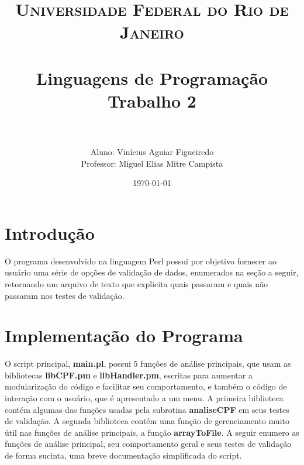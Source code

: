 \documentclass[paper=a4, fontsize=12pt]{scrartcl} %
\title{	
\normalfont \normalsize 
\textsc{Universidade Federal do Rio de Janeiro} \\ [25pt] %
\horrule{0.5pt} \\[0.4cm] %
\huge Linguagens de Programação \\
\huge Trabalho 2 \\ %
\horrule{2pt} \\[0.5cm] %
}
\author{Aluno: Vinícius Aguiar Figueiredo \\
		Professor: Miguel Elias Mitre Campista} %
\date{\normalsize\today} %
\numberwithin{equation}{section} %
\numberwithin{figure}{section} %
\numberwithin{table}{section} %
\begin{document}
\maketitle %
\clearpage

\section{Introdução}

O programa desenvolvido na linguagem Perl possui por objetivo fornecer ao usuário uma série de opções de validação de dados, enumerados na seção a seguir, retornando um arquivo de texto que explicita quais passaram e quais não passaram nos testes de validação.

\section{Implementação do Programa}

O script principal, \textbf{main.pl}, possui 5 funções de análise principais, que usam as bibliotecas \textbf{libCPF.pm} e \textbf{libHandler.pm}, escritas para aumentar a modularização do código e facilitar seu comportamento, e também o código de interação com o usuário, que é apresentado a um menu. A primeira biblioteca contém algumas das funções usadas pela subrotina \textbf{analiseCPF} em seus testes de validação. A segunda biblioteca contém uma função de gerenciamento muito útil nas funções de análise principais, a função \textbf{arrayToFile}. A seguir enumero as funções de análise principal, seu comportamento geral e seus testes de validação de forma sucinta, uma breve documentação simplificada do script.
\end{document}
